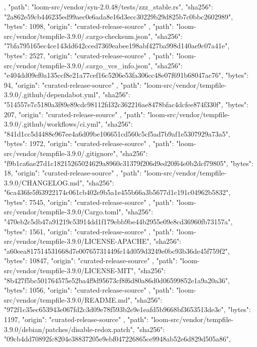 {{    },
    {
      "path": "loom-src/vendor/syn-2.0.48/tests/zzz_stable.rs",
      "sha256": "2a862e59cb446235ed99aec0e6ada8e16d3ecc30229b29d825b7c0bbc2602989",
      "bytes": 1098,
      "origin": "curated-release-source"
    },
    {
      "path": "loom-src/vendor/tempfile-3.9.0/.cargo-checksum.json",
      "sha256": "7bfa795165ec4ce143dd642cced7369eabee198abf427ba998d140ae9c07a41e",
      "bytes": 2527,
      "origin": "curated-release-source"
    },
    {
      "path": "loom-src/vendor/tempfile-3.9.0/.cargo_vcs_info.json",
      "sha256": "e404dd09ef0a135ccf8e21a77cef16c5206e53fa306cc48e07f691b68047ac76",
      "bytes": 94,
      "origin": "curated-release-source"
    },
    {
      "path": "loom-src/vendor/tempfile-3.9.0/.github/dependabot.yml",
      "sha256": "514557e7c5180a3f89e89cdc98112fd32c362216ae8478bfac4dcfee874f330f",
      "bytes": 207,
      "origin": "curated-release-source"
    },
    {
      "path": "loom-src/vendor/tempfile-3.9.0/.github/workflows/ci.yml",
      "sha256": "841d1cc5d4488e967ee4a6d09be106651cd560c5cf5ad7b9af1e5307929a73a5",
      "bytes": 1972,
      "origin": "curated-release-source"
    },
    {
      "path": "loom-src/vendor/tempfile-3.9.0/.gitignore",
      "sha256": "f9b1ca6ae27d1c18215265024629a8960c31379f206d9ed20f64e0b2dcf79805",
      "bytes": 18,
      "origin": "curated-release-source"
    },
    {
      "path": "loom-src/vendor/tempfile-3.9.0/CHANGELOG.md",
      "sha256": "6ca436fe5f63922174c061cb402e9b5a1e455b66a3b5677d1c191c04962b5832",
      "bytes": 7545,
      "origin": "curated-release-source"
    },
    {
      "path": "loom-src/vendor/tempfile-3.9.0/Cargo.toml",
      "sha256": "470eb2c5db47a91219c53914dd1f179ebb9be44b2955e09e8cd36960fb73157a",
      "bytes": 1561,
      "origin": "curated-release-source"
    },
    {
      "path": "loom-src/vendor/tempfile-3.9.0/LICENSE-APACHE",
      "sha256": "a60eea817514531668d7e00765731449fe14d059d3249e0bc93b36de45f759f2",
      "bytes": 10847,
      "origin": "curated-release-source"
    },
    {
      "path": "loom-src/vendor/tempfile-3.9.0/LICENSE-MIT",
      "sha256": "8b427f5bc501764575e52ba4f9d95673cf8f6d80a86d0d06599852e1a9a20a36",
      "bytes": 1056,
      "origin": "curated-release-source"
    },
    {
      "path": "loom-src/vendor/tempfile-3.9.0/README.md",
      "sha256": "972f1c35ec653943e067fd2c3d09e78f593b2e9e1eafd5b9668bf3653513de3e",
      "bytes": 1197,
      "origin": "curated-release-source"
    },
    {
      "path": "loom-src/vendor/tempfile-3.9.0/debian/patches/disable-redox.patch",
      "sha256": "09cb4dd70892fc8204e38837205e9ebf047226865ce9948ab52e6d829d505a86",
}}
